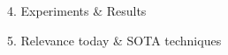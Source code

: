 \documentclass[final]{beamer}
\begin{document}
\begin{frame}[t]
\begin{columns}[t,totalwidth=\textwidth]
\begin{column}{0.3\textwidth}
\begin{block}{4. Experiments \& Results}

    \end{block}

    \begin{block}{5. Relevance today \& SOTA techniques}


\end{block}
\end{column}
\end{columns}
\end{frame}
\end{document}
